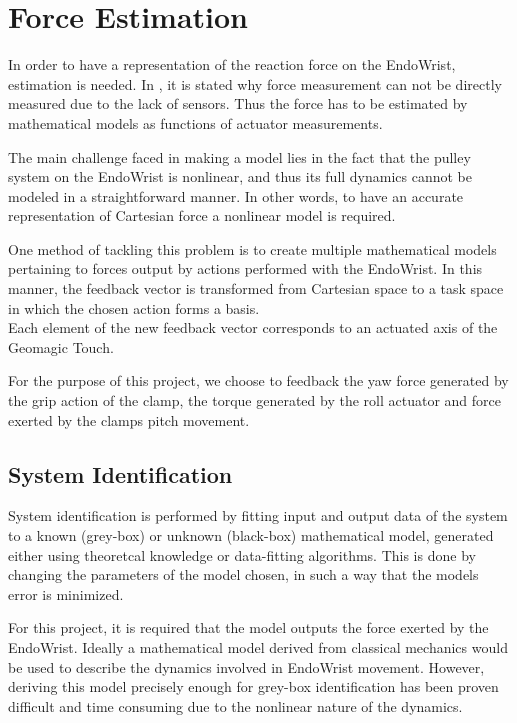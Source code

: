 \chapter{Force Estimation}
In order to have a representation of the reaction force on the EndoWrist, estimation is needed. 
In , it is stated why force measurement can not be directly measured due to the lack of sensors. Thus the force has to be estimated by mathematical models as functions of actuator measurements.

The main challenge faced in making a model lies in the fact that the pulley system on the EndoWrist is nonlinear, and thus its full dynamics cannot be modeled in a straightforward manner. 
In other words, to have an accurate representation of Cartesian force a  nonlinear model is required.

One method of tackling this problem is to create multiple mathematical models pertaining to forces output by actions performed with the EndoWrist.
In this manner, the feedback vector is transformed from Cartesian space to a task space in which the chosen action forms a basis.\\
Each element of the new feedback vector corresponds to an actuated axis of the Geomagic Touch.

For the purpose of this project, we choose to feedback the yaw force generated by the grip action of the clamp, the torque generated by the roll actuator and force exerted by the clamps pitch movement.

\section{System Identification}
System identification is performed by fitting input and output data of the system to a known (grey-box) or unknown (black-box) mathematical model, generated either using theoretcal knowledge or data-fitting algorithms. 
This is done by changing the parameters of the model chosen, in such a way that the models error is minimized. 

For this project, it is required that the model outputs the force exerted by the EndoWrist.
Ideally a mathematical model derived from classical mechanics would be used to describe the dynamics involved in EndoWrist movement.
However, deriving this model precisely enough for grey-box identification has been proven difficult and time consuming due to the nonlinear nature of the dynamics\cite{kim2014dynamic}.

